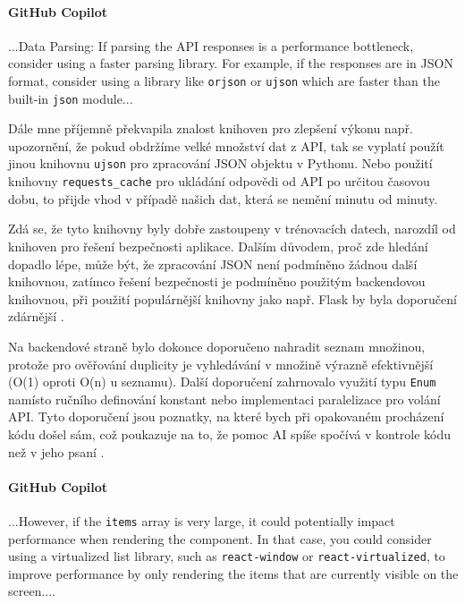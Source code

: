\documentclass[FM,DP]{tulthesis}
\begin{document}
		\vspace{0.6em}
		\begin{tcolorbox}[colback=white,colframe=black]
			\paragraph{GitHub Copilot}
			...Data Parsing: If parsing the API responses is a performance bottleneck, consider using a faster parsing library. For example, if the responses are in JSON format, consider using a library like \verb|orjson| or \verb|ujson| which are faster than the built-in \verb|json| module... \cite{enum}
		\end{tcolorbox}
		
		Dále mne příjemně překvapila znalost knihoven pro zlepšení výkonu např. upozornění, že pokud obdržíme velké množství dat z API, tak se vyplatí použít jinou knihovnu \verb|ujson| pro zpracování JSON objektu v Pythonu. Nebo použití knihovny \verb|requests_cache| pro ukládání odpovědi od API po určitou časovou dobu, to přijde vhod v případě našich dat, která se nemění minutu od minuty. 
		
		Zdá se, že tyto knihovny byly dobře zastoupeny v trénovacích datech, narozdíl od knihoven pro řešení bezpečnosti aplikace. Dalším důvodem, proč zde hledání dopadlo lépe, může být, že zpracování JSON není podmíněno žádnou další knihovnou, zatímco řešení bezpečnosti je podmíněno použitým backendovou knihovnou, při použití populárnější knihovny jako např. Flask by byla doporučení zdárnější \cite{flask}.
		
		Na backendové straně bylo dokonce doporučeno nahradit seznam množinou, protože pro ověřování duplicity je vyhledávání v množině výrazně efektivnější (O(1) oproti O(n) u seznamu). Další doporučení zahrnovalo využití typu \verb|Enum| namísto ručního definování konstant nebo implementaci paralelizace pro volání API. Tyto doporučení jsou poznatky, na které bych při opakovaném procházení kódu došel sám, což poukazuje na to, že pomoc AI spíše spočívá v kontrole kódu než v jeho psaní \cite{meteo_parser} \cite{enum} \cite{dataclass}.
		
		\vspace{0.6em}
		\begin{tcolorbox}[colback=white,colframe=black]
			\paragraph{GitHub Copilot}
			...However, if the \verb|items| array is very large, it could potentially impact performance when rendering the component. In that case, you could consider using a virtualized list library, such as \verb|react-window| or \verb|react-virtualized|, to improve performance by only rendering the items that are currently visible on the screen.... \cite{enum}
		\end{tcolorbox}
		
\end{document}
